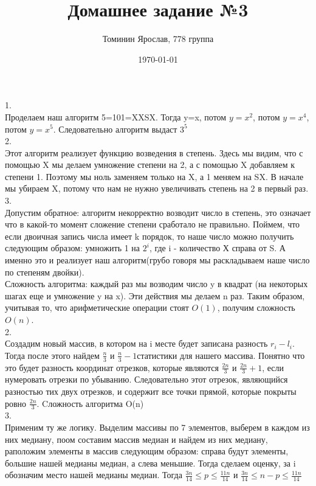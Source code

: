 \documentclass[a4paper,12pt]{article}
\author{Томинин Ярослав, 778 группа}
\title{Домашнее задание №3}
\date{\today}
\begin{document}
 

\maketitle
\newpage


1.\\ 
Проделаем наш алгоритм 5=101=XXSX. Тогда y=x, потом $y=x^2$, потом $y=x^4$, потом $y=x^5$. Следовательно алгоритм выдаст $3^5$\\
2.\\
Этот алгоритм реализует функцию возведения в степень. Здесь мы видим, что с помощью X мы делаем умножение степени на 2, а с помощью X добавляем к степени 1. Поэтому мы ноль заменяем только на X, а 1 меняем на SX. В начале мы убираем X, потому что нам не нужно увеличивать степень на 2 в первый раз.\\
3.\\
Допустим обратное: алгоритм некорректно возводит число в степень, это означает что в какой-то момент сложение степени сработало не правильно. Поймем, что если двоичная запись числа имеет k порядок, то наше число можно получить следующим образом: умножить 1 на $2^i$, где i - количество Х справа от S. А именно это и реализует наш алгоритм(грубо говоря мы раскладываем наше число по степеням двойки).\\
Сложность алгоритма: каждый раз мы возводим число y в квадрат (на некоторых шагах еще и умножение y на x). Эти действия мы делаем n раз. Таким образом, учитывая то, что арифметические операции стоят $O(1)$, получим сложность $O(n)$.\\
2.\\
Создадим новый массив, в котором на i месте будет записана разность $r_i-l_i$. Тогда после этого найдем $\frac{n}{3}$ и $\frac{n}{3}-1$статистики для нашего массива. Понятно что это будет разность координат отрезков, которые являются $\frac{2n}{3}$ и $\frac{2n}{3}+1$, если нумеровать отрезки по убыванию. Следовательно этот отрезок, являющийся разностью тих двух отрезков,  и содержит все точки прямой, которые покрыты ровно $\frac{2n}{3}$. Cложность алгоритма O(n)\\
3.\\
Применим ту же логику. Выделим массивы по 7 элементов, выберем в каждом из них медиану, поом составим массив медиан и найдем из них медиану, раположим элементы в массив следующим образом: справа будут элементы, большие нашей медианы медиан, а слева меньшие. Тогда сделаем оценку, за i обозначим место нашей медианы медиан. Тогда $\frac{3n}{14} \leq p\leq \frac{11n}{14}$ и $\frac{3n}{14} \leq n-p\leq \frac{11n}{14}$\\
\end{document}
